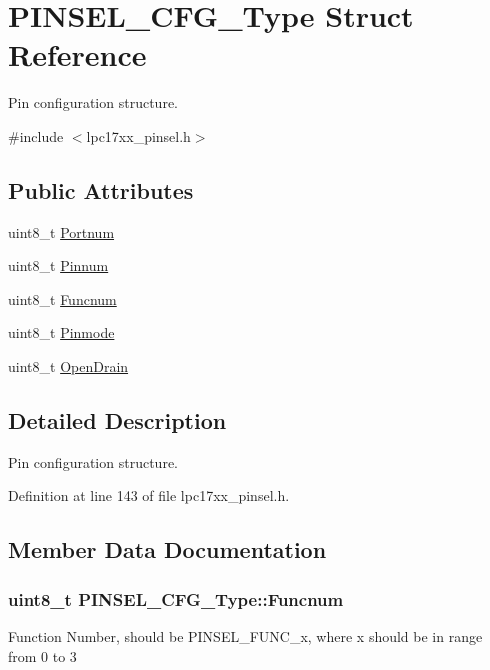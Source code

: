 \hypertarget{struct_p_i_n_s_e_l___c_f_g___type}{\section{\-P\-I\-N\-S\-E\-L\-\_\-\-C\-F\-G\-\_\-\-Type \-Struct \-Reference}
\label{struct_p_i_n_s_e_l___c_f_g___type}
}


\-Pin configuration structure.  




{\ttfamily \#include $<$lpc17xx\-\_\-pinsel.\-h$>$}

\subsection*{\-Public \-Attributes}
\begin{DoxyCompactItemize}
\item 
uint8\-\_\-t \hyperlink{struct_p_i_n_s_e_l___c_f_g___type_a6b754912548dadd6634bb39c8b760fd1}{\-Portnum}
\item 
uint8\-\_\-t \hyperlink{struct_p_i_n_s_e_l___c_f_g___type_a6d439a871adb445a571aa28806593532}{\-Pinnum}
\item 
uint8\-\_\-t \hyperlink{struct_p_i_n_s_e_l___c_f_g___type_a3a18a3aab63914a40dad89c8272ad4f4}{\-Funcnum}
\item 
uint8\-\_\-t \hyperlink{struct_p_i_n_s_e_l___c_f_g___type_a04c559184af47bae47fd03f6e8430145}{\-Pinmode}
\item 
uint8\-\_\-t \hyperlink{struct_p_i_n_s_e_l___c_f_g___type_af5bbd6b617833ebc7d0da0ed8b8fe595}{\-Open\-Drain}
\end{DoxyCompactItemize}


\subsection{\-Detailed \-Description}
\-Pin configuration structure. 

\-Definition at line 143 of file lpc17xx\-\_\-pinsel.\-h.



\subsection{\-Member \-Data \-Documentation}
\hypertarget{struct_p_i_n_s_e_l___c_f_g___type_a3a18a3aab63914a40dad89c8272ad4f4}{
\subsubsection[{\-Funcnum}]{\setlength{\rightskip}{0pt plus 5cm}uint8\-\_\-t {\bf \-P\-I\-N\-S\-E\-L\-\_\-\-C\-F\-G\-\_\-\-Type\-::\-Funcnum}}}\label{struct_p_i_n_s_e_l___c_f_g___type_a3a18a3aab63914a40dad89c8272ad4f4}
\-Function \-Number, should be \-P\-I\-N\-S\-E\-L\-\_\-\-F\-U\-N\-C\-\_\-x, where x should be in range from 0 to 3 

